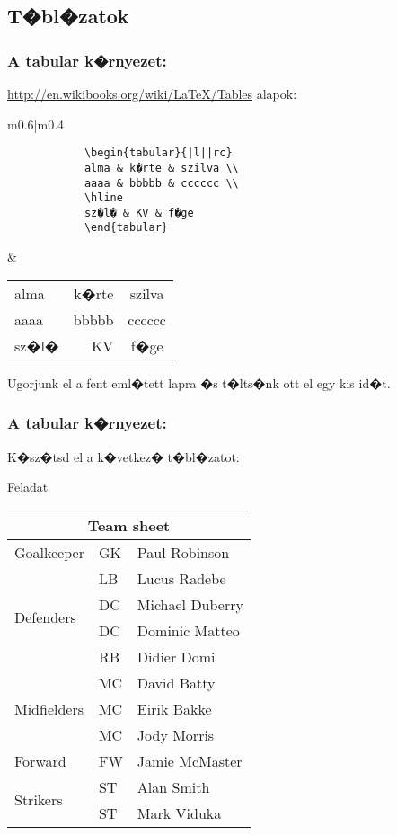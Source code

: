 \documentclass[xcolor=pdftex,dvipsnames,table,compress,bigger]{beamer}
\begin{document}
\subsection{T�bl�zatok}
\begin{frame}[fragile]
    \frametitle{A tabular k�rnyezet:}
    \url{http://en.wikibooks.org/wiki/LaTeX/Tables}
    alapok:
    
    \begin{tabular}{m{}|m{}}
    \begin{verbatim}
			\begin{tabular}{|l||rc}
			alma & k�rte & szilva \\
			aaaa & bbbbb & cccccc \\
			\hline
			sz�l� & KV & f�ge
			\end{tabular}
		\end{verbatim}
		&
    \begin{tabular}{|l||rc}
			alma & k�rte & szilva \\
			aaaa & bbbbb & cccccc \\
			\hline
			sz�l� & KV & f�ge
			\end{tabular}
    \end{tabular}
    Ugorjunk el a fent eml�tett lapra �s t�lts�nk ott el egy kis id�t.
\end{frame}

\begin{frame}[fragile]
    \frametitle{A tabular k�rnyezet:}
    K�sz�tsd el a k�vetkez� t�bl�zatot:
    \begin{exampleblock}{Feladat}
    \begin{tabular}{|l|l|l|}
\hline
\multicolumn{3}{|c|}{Team sheet} \\
\hline
Goalkeeper & GK & Paul Robinson \\ \hline
\multirow{4}{*}{Defenders} & LB & Lucus Radebe \\
 & DC & Michael Duberry \\
 & DC & Dominic Matteo \\
 & RB & Didier Domi \\ \hline
\multirow{3}{*}{Midfielders} & MC & David Batty \\
 & MC & Eirik Bakke \\
 & MC & Jody Morris \\ \hline
Forward & FW & Jamie McMaster \\ \hline
\multirow{2}{*}{Strikers} & ST & Alan Smith \\
 & ST & Mark Viduka \\
\hline
\end{tabular}
    \end{exampleblock}
\end{frame}
\end{document}
